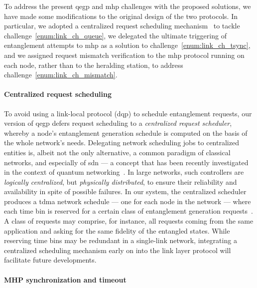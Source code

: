 To address the present \acrshort{qegp} and \acrshort{mhp} challenges with the proposed solutions, we
have made some modifications to the original design of the two protocols. In particular, we adopted
a centralized request scheduling mechanism~\cite{skrzypczyk_2021_arch} to tackle
challenge~\ref{enum:link_ch_queue}, we delegated the ultimate triggering of entanglement attempts to
\acrshort{mhp} as a solution to challenge~\ref{enum:link_ch_tsync}, and we assigned request mismatch
verification to the \acrshort{mhp} protocol running on each node, rather than to the heralding
station, to address challenge~\ref{enum:link_ch_mismatch}.

\paragraph{Centralized request scheduling}

To avoid using a link-local protocol (\acrshort{dqp}) to schedule entanglement requests, our version
of \acrshort{qegp} defers request scheduling to a \emph{centralized request scheduler}, whereby a
node's entanglement generation schedule is computed on the basis of the whole network's needs.
Delegating network scheduling jobs to centralized entities is, albeit not the only alternative, a
common paradigm of classical networks, and especially of \acrfull{sdn} --- a concept that has been
recently investigated in the context of quantum networking~\cite{aguado_2020_enabling,
kozlowski_2020_p4}. In large networks, such controllers are \emph{logically centralized}, but
\emph{physically distributed}, to ensure their reliability and availability in spite of possible
failures. In our system, the centralized scheduler produces a \acrfull{tdma} network schedule ---
one for each node in the network --- where each time bin is reserved for a certain class of
entanglement generation requests~\cite{skrzypczyk_2021_arch}. A class of requests may comprise, for
instance, all requests coming from the same application and asking for the same fidelity of the
entangled states. While reserving time bins may be redundant in a single-link network, integrating a
centralized scheduling mechanism early on into the link layer protocol will facilitate future
developments.

\paragraph{MHP synchronization and timeout}

